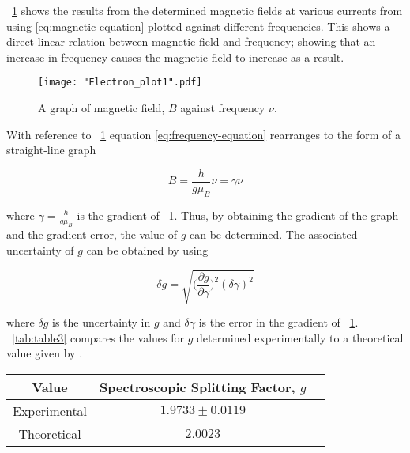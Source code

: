 \documentclass{article}
\newcommand{\figref}[2][\figurename~]{#1\ref{#2}}
\newcommand{\tabref}[2][\tablename~]{#1\ref{#2}}
\begin{document}
\figref{fig:Electron_Plot} shows the results from the determined magnetic fields at various currents from using \eqref{eq:magnetic-equation} plotted against different frequencies. This shows a direct linear relation between magnetic field and frequency; showing that an increase in frequency causes the magnetic field to increase as a result.

\begin{figure}[h]
\centering
\texttt{[image: "Electron\_plot1".pdf]}
\caption{A graph of magnetic field, $B$ against frequency $\nu$.}
\label{fig:Electron_Plot}
\end{figure}

\newpage
\vspace{2mm}
\noindent
With reference to \figref{fig:Electron_Plot} equation \eqref{eq:frequency-equation} rearranges to the form of a straight-line graph

\begin{equation}
\label{eq:g-value}
B = \frac{h}{g\mu_B}\nu = \gamma\nu
\end{equation}

\vspace{2mm}
\noindent
where $\gamma = \frac{h}{g\mu_B}$ is the gradient of \figref{fig:Electron_Plot}. Thus, by obtaining the gradient of the graph and the gradient error, the value of $g$ can be determined. The associated uncertainty of $g$ can be obtained by using

\begin{equation}
\label{eq:g-error}
\delta g = \sqrt{\bigg(\frac{\partial{g}}{\partial{\gamma}}\bigg)^2 (\delta\gamma)^2}
\end{equation}

\vspace{2mm}
\noindent
where $\delta g$ is the uncertainty in $g$ and $\delta\gamma$ is the error in the gradient of \figref{fig:Electron_Plot}. \tabref{tab:table3} compares the values for $g$ determined experimentally to a theoretical value given by \cite{Paper02}.

\vspace{5mm}
\begin{table*}[h]
\centering %
\caption{Table of Calculated Values and Published Values for the Spectroscopic Splitting Factor.}
\label{tab:table3}
\begin{tabular}{|c|c|c|}
\hline
Value & Spectroscopic Splitting Factor, $g$ \\
\hline
Experimental & $1.9733 \pm 0.0119$ \\
\hline
Theoretical \cite{Paper02} & $2.0023$ \\
\hline
\end{tabular}
\end{table*}
\end{document}
